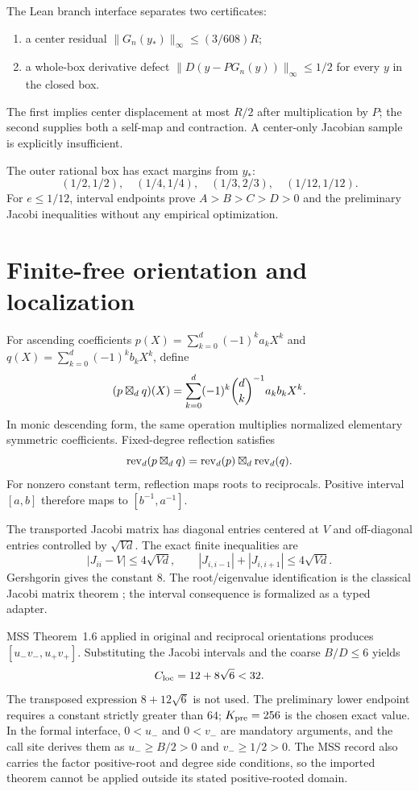 \documentclass[10pt]{article}
\begin{document}
The Lean branch interface separates two certificates:
\begin{enumerate}
\item a center residual
$\|G_n(y_*)\|_\infty\le(3/608)R$;
\item a whole-box derivative defect
$\|D(y-PG_n(y))\|_\infty\le1/2$ for every $y$ in the closed box.
\end{enumerate}
The first implies center displacement at most $R/2$ after multiplication by
$P$; the second supplies both a self-map and contraction.  A center-only
Jacobian sample is explicitly insufficient.

The outer rational box has exact margins from $y_*$:
\[
 (1/2,1/2),\quad(1/4,1/4),\quad(1/3,2/3),\quad(1/12,1/12).
\]
For $e\le1/12$, interval endpoints prove $A>B>C>D>0$ and the preliminary
Jacobi inequalities without any empirical optimization.

\section{Finite-free orientation and localization}\label{sup:finitefree}

For ascending coefficients
$p(X)=\sum_{k=0}^{d}(-1)^ka_kX^k$ and
$q(X)=\sum_{k=0}^{d}(-1)^kb_kX^k$, define
\begin{equation}\label{sup:ascending-conv}
 (p\boxtimes_d q)(X)=
 \sum_{k=0}^{d}(-1)^k\binom dk^{-1}a_kb_kX^k.
\end{equation}
In monic descending form, the same operation multiplies normalized elementary
symmetric coefficients.  Fixed-degree reflection satisfies
\[
 \operatorname{rev}_d(p\boxtimes_d q)
 =\operatorname{rev}_d(p)\boxtimes_d\operatorname{rev}_d(q).
\]
For nonzero constant term, reflection maps roots to reciprocals.  Positive
interval $[a,b]$ therefore maps to $[b^{-1},a^{-1}]$.

The transported Jacobi matrix has diagonal entries centered at $V$ and
off-diagonal entries controlled by $\sqrt{Vd}$.  The exact finite inequalities
are
\[
 |J_{ii}-V|\le4\sqrt{Vd},\qquad
 |J_{i,i-1}|+|J_{i,i+1}|\le4\sqrt{Vd}.
\]
Gershgorin gives the constant $8$.  The root/eigenvalue identification is the
classical Jacobi matrix theorem \cite{Szego1975}; the interval consequence is
formalized as a typed adapter.

MSS Theorem~1.6 applied in original and reciprocal orientations produces
$[u_-v_-,u_+v_+]$.  Substituting the Jacobi intervals and the coarse
$B/D\le6$ yields
\[
 C_{\rm loc}=12+8\sqrt6<32.
\]
The transposed expression $8+12\sqrt6$ is not used.  The preliminary lower
endpoint requires a constant strictly greater than $64$; $K_{\rm pre}=256$
is the chosen exact value.  In the formal interface, $0<u_-$ and $0<v_-$ are
mandatory arguments, and the call site derives them as $u_-\ge B/2>0$ and
$v_-\ge1/2>0$.  The MSS record also carries the factor positive-root and
degree side conditions, so the imported theorem cannot be applied outside
its stated positive-rooted domain.
\end{document}
